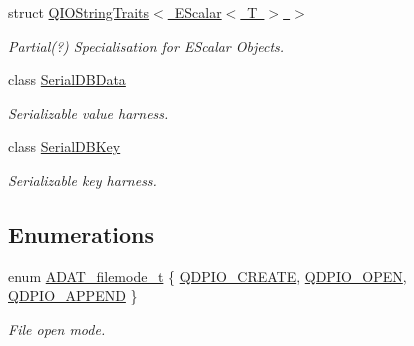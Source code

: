 \begin{DoxyCompactItemize}
struct \mbox{\hyperlink{structADATIO_1_1QIOStringTraits_3_01EScalar_3_01T_01_4_01_4}{Q\+I\+O\+String\+Traits$<$ E\+Scalar$<$ T $>$ $>$}}
\begin{DoxyCompactList}\small\item\em Partial(?) Specialisation for E\+Scalar Objects. \end{DoxyCompactList}\item 
class \mbox{\hyperlink{classADATIO_1_1SerialDBData}{Serial\+D\+B\+Data}}
\begin{DoxyCompactList}\small\item\em Serializable value harness. \end{DoxyCompactList}\item 
class \mbox{\hyperlink{classADATIO_1_1SerialDBKey}{Serial\+D\+B\+Key}}
\begin{DoxyCompactList}\small\item\em Serializable key harness. \end{DoxyCompactList}\end{DoxyCompactItemize}
\subsection*{Enumerations}
\begin{DoxyCompactItemize}
\item 
enum \mbox{\hyperlink{group__qio_ga669520ca9003997be838730beef322b4}{A\+D\+A\+T\+\_\+filemode\+\_\+t}} \{ \mbox{\hyperlink{group__qio_gga669520ca9003997be838730beef322b4a26364b4509b37147465990b221a87326}{Q\+D\+P\+I\+O\+\_\+\+C\+R\+E\+A\+TE}}, 
\mbox{\hyperlink{group__qio_gga669520ca9003997be838730beef322b4a700314a4acc8fad5ceb1e154792e27c9}{Q\+D\+P\+I\+O\+\_\+\+O\+P\+EN}}, 
\mbox{\hyperlink{group__qio_gga669520ca9003997be838730beef322b4a3f4180520ebc75ea34f783aaea3ec69b}{Q\+D\+P\+I\+O\+\_\+\+A\+P\+P\+E\+ND}}
 \}
\begin{DoxyCompactList}\small\item\em File open mode. \end{DoxyCompactList}\end{DoxyCompactItemize}
